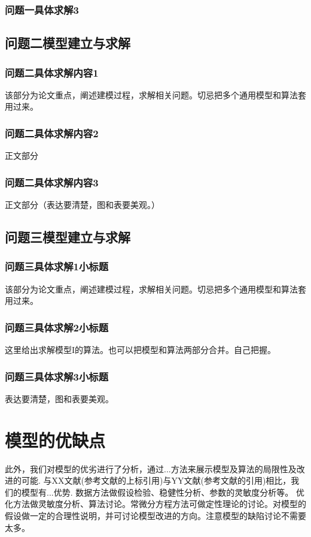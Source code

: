 \documentclass{cumcm}
\begin{document}
\subsubsection{问题一具体求解3}



\subsection{问题二模型建立与求解}
\subsubsection{问题二具体求解内容1}
该部分为论文重点，阐述建模过程，求解相关问题。切忌把多个通用模型和算法套用过来。

\subsubsection{问题二具体求解内容2}
正文部分

\subsubsection{问题二具体求解内容3}
正文部分（表达要清楚，图和表要美观。）

\subsection{问题三模型建立与求解}
\subsubsection{问题三具体求解1小标题}
该部分为论文重点，阐述建模过程，求解相关问题。切忌把多个通用模型和算法套用过来。

\subsubsection{问题三具体求解2小标题}
这里给出求解模型I的算法。也可以把模型和算法两部分合并。自己把握。

\subsubsection{问题三具体求解3小标题}
表达要清楚，图和表要美观。

\section{模型的优缺点}
此外，我们对模型的优劣进行了分析，通过...方法来展示模型及算法的局限性及改进的可能. 
与XX文献(参考文献的上标引用)与YY文献\cite{ref1}(参考文献的引用)相比，我们的模型有...优势. 
数据方法做假设检验、稳健性分析、参数的灵敏度分析等。
优化方法做灵敏度分析、算法讨论。常微分方程方法可做定性理论的讨论。对模型的假设做一定的合理性说明，并可讨论模型改进的方向。注意模型的缺陷讨论不需要太多。
\end{document}

